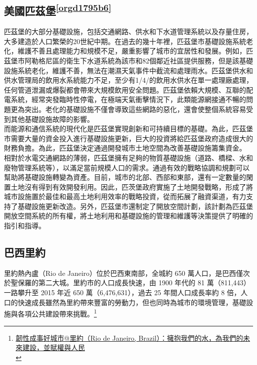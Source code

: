 \documentclass[a4paper,12pt]{article}
\begin{document}
\subsection{美國匹茲堡\textsuperscript{\ref{orgd1795b6}}}
\label{sec:orgb0ddf0f}
匹茲堡的大部分基礎設施，包括交通網路、供水和下水道管理系統以及存量住房，大多建造於人口繁榮的20世紀中期。在過去的幾十年裡，匹茲堡市基礎設施系統老化，維護不善且處理能力和規模不足，嚴重影響了城市的宜居性和發展。例如，匹茲堡市阿勒格尼區的衛生下水道系統為該市和82個鄰近社區提供服務，但是該基礎設施系統老化，維護不善，無法在潮濕天氣事件中截流和處理雨水。匹茲堡供水和供水管理局的飲用水系統能力不足，至少有1/4/的飲用水供水在單一處理廠處理，任何管道泄漏或爆裂都會帶來大規模飲用安全問題。匹茲堡依賴大規模、互聯的配電系統，經常突發臨時性停電，在極端天氣衝擊情況下，此類能源網接通不暢的問題更為突出。老化的基礎設施不僅會導致這些網路的惡化，還會使整個系統容易受到其他基礎設施故障的影響。\\

而能源和通信系統的現代化是匹茲堡實現創新和可持續目標的基礎。為此，匹茲堡市需要大量的資金投入進行基礎設施更新，巨大的投資將給匹茲堡政府造成很大的財務負擔。為此，匹茲堡決定通過開發城市土地空間為改善基礎設施籌集資金。\\

相對於水電交通網路的薄弱，匹茲堡擁有足夠的物質基礎設施（道路、橋樑、水和廢物管理系統等），以滿足當前規模人口的需求。通過有效的戰略協調和規劃可以幫助將基礎設施轉變為資產。目前，城市的北部、西部和東部，還有一定數量的閑置土地沒有得到有效開發利用。因此，匹茨堡政府實施了土地開發戰略，形成了將城市設施置於最佳和最高土地利用效率的戰略投資，從而拓展了融資渠道，有力支持了基礎設施更新改造。另外，匹茲堡市還制定了開放空間計劃，該計劃為匹茲堡開放空間系統的所有權，將土地利用和基礎設施的管理和維護等決策提供了明確的指引和指導。\\

\subsection{巴西里約}
\label{sec:org4482f33}
里約熱內盧（Rio de Janeiro）位於巴西東南部，全城約 650 萬人口，是巴西僅次於聖保羅的第二大城。里約市的人口成長快速，由 1900 年代的 81 萬（811,443）一路攀升至 2015 年近 650 萬（6,476,631），過去 25 年間人口成長率約 8 倍，人口的快速成長雖然為里約帶來豐富的勞動力，但也同時為城市的環境管理，基礎設施與各項公共建設帶來挑戰。\footnote{\href{https://eyesonplace.net/2018/12/12/9554/}{韌性成事好城市@里約（Rio de Janeiro, Brazil）：擁抱我們的水，為我們的未來建設，並賦權與人民}\\\label{org6d75efd}}\\
\end{document}
